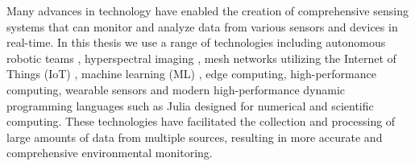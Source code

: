 Many advances in technology have enabled the creation of comprehensive sensing systems that can monitor and analyze data from various sensors and devices in real-time. In this thesis we use a range of technologies including autonomous robotic teams \citep{Dunbabin2012, Rubenstein2014, Chen2017}, hyperspectral imaging \citep{Plaza2009, Li2018, Zhu2017}, mesh networks utilizing the Internet of Things (IoT) \citep{Gubbi2013, Atzori2010, Al-Fuqaha2015}, machine learning (ML) \citep{Goodfellow2016, LeCun2015, Jordan2015}, edge computing, high-performance computing,  wearable sensors and modern high-performance dynamic programming languages such as Julia \citep{Bezanson2017} designed for numerical and scientific computing. These technologies have facilitated the collection and processing of large amounts of data from multiple sources, resulting in more accurate and comprehensive environmental monitoring.

